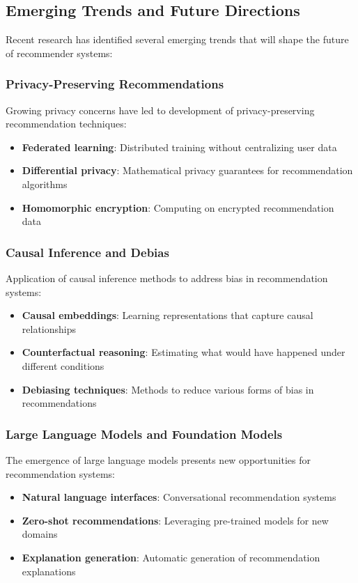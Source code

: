 \subsection{Emerging Trends and Future Directions}

Recent research has identified several emerging trends that will shape the future of recommender systems:

\subsubsection{Privacy-Preserving Recommendations}
Growing privacy concerns have led to development of privacy-preserving recommendation techniques:
\begin{itemize}
    \item \textbf{Federated learning}: Distributed training without centralizing user data~\cite{chai2020secure}
    \item \textbf{Differential privacy}: Mathematical privacy guarantees for recommendation algorithms~\cite{mcsherry2009differentially}
    \item \textbf{Homomorphic encryption}: Computing on encrypted recommendation data~\cite{erkin2012privacy}
\end{itemize}

\subsubsection{Causal Inference and Debias}
Application of causal inference methods to address bias in recommendation systems:
\begin{itemize}
    \item \textbf{Causal embeddings}: Learning representations that capture causal relationships~\cite{bonner2018causal}
    \item \textbf{Counterfactual reasoning}: Estimating what would have happened under different conditions~\cite{schnabel2016recommendations}
    \item \textbf{Debiasing techniques}: Methods to reduce various forms of bias in recommendations~\cite{chen2020bias}
\end{itemize}

\subsubsection{Large Language Models and Foundation Models}
The emergence of large language models presents new opportunities for recommendation systems:
\begin{itemize}
    \item \textbf{Natural language interfaces}: Conversational recommendation systems~\cite{gao2021advances}
    \item \textbf{Zero-shot recommendations}: Leveraging pre-trained models for new domains~\cite{hou2023large}
    \item \textbf{Explanation generation}: Automatic generation of recommendation explanations~\cite{zhang2020explainable}
\end{itemize}

